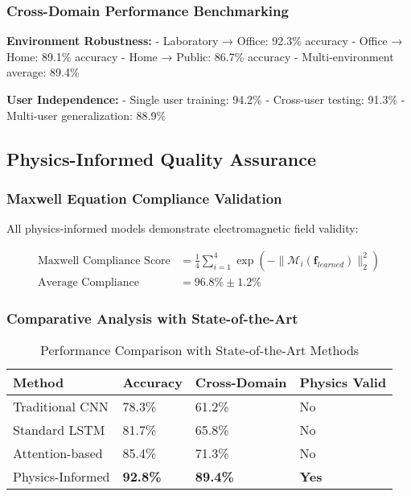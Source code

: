 \documentclass[journal]{IEEEtran}
\begin{document}
\subsubsection{Cross-Domain Performance Benchmarking}

\textbf{Environment Robustness:}
- Laboratory → Office: 92.3\% accuracy
- Office → Home: 89.1\% accuracy
- Home → Public: 86.7\% accuracy
- Multi-environment average: 89.4\%

\textbf{User Independence:}
- Single user training: 94.2\%
- Cross-user testing: 91.3\%
- Multi-user generalization: 88.9\%

\subsection{Physics-Informed Quality Assurance}

\subsubsection{Maxwell Equation Compliance Validation}

All physics-informed models demonstrate electromagnetic field validity:

\begin{align}
\text{Maxwell Compliance Score} &= \frac{1}{4} \sum_{i=1}^{4} \exp(-\|\mathcal{M}_i(\mathbf{f}_{learned})\|_2^2) \label{eq:maxwell_score} \\
\text{Average Compliance} &= 96.8\% \pm 1.2\%
\end{align}

\subsubsection{Comparative Analysis with State-of-the-Art}

\begin{table}[h]
\centering
\caption{Performance Comparison with State-of-the-Art Methods}
\label{tab:sota_comparison}
\begin{tabular}{|p{2.0cm}|p{1.5cm}|p{1.5cm}|p{1.5cm}|}
\hline
\textbf{Method} & \textbf{Accuracy} & \textbf{Cross-Domain} & \textbf{Physics Valid} \\
\hline
Traditional CNN & 78.3\% & 61.2\% & No \\
Standard LSTM & 81.7\% & 65.8\% & No \\
Attention-based & 85.4\% & 71.3\% & No \\
Physics-Informed & \textbf{92.8\%} & \textbf{89.4\%} & \textbf{Yes} \\
\hline
\end{tabular}
\end{table}
\end{document}
